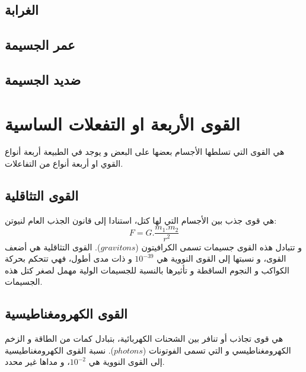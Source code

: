 \subsection{ الغرابة}

\subsection{ عمر الجسيمة}

\subsection{ ضديد الجسيمة}

\section{القوى اﻷربعة او التفعلات الساسية}

هي القوى التي تسلطها اﻷجسام بعضها على البعض و يوجد في الطبيعة أربعة أنواع القوي او أربعة أنواع من التفاعلات.
 \subsection{ القوى التثاقلية}
هي قوى جذب بين اﻷجسام التي لها كتل، استنادا إلى قانون الجذب العام لنيوتن:
\begin{equation}
	F=G.\dfrac{m_{1}.m_{2}}{r^{2}}
\end{equation}
و تتبادل هذه القوى جسيمات تسمى الكرافيتون ($gravitons$).
القوى التثاقلية هي أضعف القوى، و نسبتها إلى القوى النووية هي
$10^{-39}$ 
و ذات مدى أطول، فهي تتحكم بحركة الكواكب و النجوم الساقطة و تأثيرها بالنسبة للجسيمات الولية مهمل لصغر كتل هذه الجسيمات.
 \subsection{ القوى الكهرومغناطيسية}
 هي قوى تجاذب أو تنافر بين الشحنات الكهربائية، بتبادل كمات من الطاقة و الزخم الكهرومغناطيسي و التي تسمى الفوتونات ($photons$).
 نسبة القوى الكهرومغناطيسية إلى القوى النووية هي $10^{-2}$، و مداها غير محدد.
